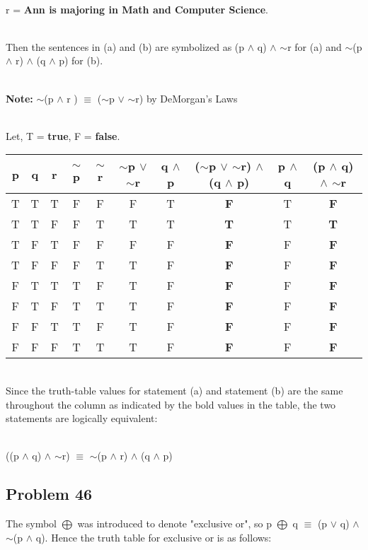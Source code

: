 \documentclass{article}
\begin{document}
\\ r = \textbf{Ann is majoring in Math and Computer Science}.

\\ Then the sentences in (a) and (b) are symbolized as (p $\wedge$ q) $\wedge$ $\sim$r for (a) and $\sim$(p $\wedge$ r) $\wedge$ (q $\wedge$ p) for (b).

\\ \textbf{Note:} $\sim$(p $\wedge$ r ) $\equiv$ ($\sim$p $\vee$ $\sim$r) by DeMorgan's Laws

\\ Let, T = \textbf{true}, F = \textbf{false}.
\begin{center}
	\begin{tabular}{ |c|c|c|c|c|c|c|c|c|c| } 
		\hline
		p & q & r & $\sim$p & $\sim$r & $\sim$p $\vee$ $\sim$r & q $\wedge$ p & ($\sim$p $\vee$ $\sim$r) $\wedge$ (q $\wedge$ p) & p $\wedge$ q & (p $\wedge$ q) $\wedge$ $\sim$r  \\ 
		\hline
		T & T & T & F & F & F & T & \textbf{F} & T & \textbf{F}\\ 
		T & T & F & F & T & T & T & \textbf{T} & T & \textbf{T}\\ 
		T & F & T & F & F & F & F & \textbf{F} & F & \textbf{F}\\ 
		T & F & F & F & T & T & F & \textbf{F} & F & \textbf{F}\\ 
		F & T & T & T & F & T & F & \textbf{F} & F & \textbf{F}\\ 
		F & T & F & T & T & T & F & \textbf{F} & F & \textbf{F}\\ 
		F & F & T & T & F & T & F & \textbf{F} & F & \textbf{F}\\ 
		F & F & F & T & T & T & F & \textbf{F} & F & \textbf{F}\\ 
		\hline
	\end{tabular}
\end{center}

\\ Since the truth-table values for statement (a) and statement (b) are the same throughout the column as indicated by the bold values in the table, the two statements are logically equivalent: 

\\ ((p $\wedge$ q) $\wedge$ $\sim$r) $\equiv$ $\sim$(p $\wedge$ r) $\wedge$ (q $\wedge$ p)


\subsection*{Problem 46}
The symbol $\bigoplus$ was introduced to denote "exclusive or", so p $\bigoplus$ q $\equiv$ (p $\vee$ q) $\wedge$ $\sim$(p $\wedge$ q). Hence the truth table for exclusive or is as follows:
\end{document}

